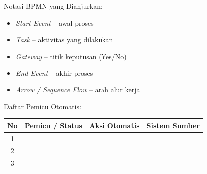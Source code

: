 \documentclass[12pt,a4paper]{report}
\begin{document}
\vspace{0.4cm}

\newcommand{\symstart}{\raisebox{-1pt}{\tikz\draw[green!60!black, fill=green!15] (0,0) circle (3.5pt);}}
\newcommand{\symtask}{\raisebox{-1pt}{\tikz\draw[plnblue, fill=plnblue!10, rounded corners=1pt] (-4pt,-2.5pt) rectangle (4pt,2.5pt);}}
\newcommand{\symgateway}{\raisebox{-1pt}{\tikz\draw[plnorange!80!black, fill=plnorange!10] (0,0) -- (3.5pt,3.5pt) -- (0,7pt) -- (-3.5pt,3.5pt) -- cycle;}}
\newcommand{\symend}{\raisebox{-1pt}{\tikz\draw[plnblue!80!black, fill=plnblue!20, line width=1pt] (0,0) circle (3.5pt);}}
\newcommand{\symarrow}{\raisebox{-1pt}{{\color{plnblue}$\longrightarrow$}}}

\begin{wstipbox}
Notasi BPMN yang Dianjurkan:
\begin{itemize}
    \item[\symstart] \textit{Start Event} -- awal proses
    \item[\symtask] \textit{Task} -- aktivitas yang dilakukan
    \item[\symgateway] \textit{Gateway} -- titik keputusan (Yes/No)
    \item[\symend] \textit{End Event} -- akhir proses
    \item[\symarrow] \textit{Arrow / Sequence Flow} -- arah alur kerja
\end{itemize}
\end{wstipbox}

\vspace{0.3cm}

\noindent Daftar Pemicu Otomatis:

\vspace{0.2cm}

\noindent
{\small
\renewcommand{\arraystretch}{2.0}
\begin{tabularx}{\textwidth}{@{} c >{\raggedright\arraybackslash}X >{\raggedright\arraybackslash}X >{\raggedright\arraybackslash}X @{}}
\toprule
\textbf{No} & \textbf{Pemicu / Status} & \textbf{Aksi Otomatis} & \textbf{Sistem Sumber} \\
\midrule
1 & & & \\
\hline
2 & & & \\
\hline
3 & & & \\
\bottomrule
\end{tabularx}
\renewcommand{\arraystretch}{1.0}
}


\newpage
\end{document}
